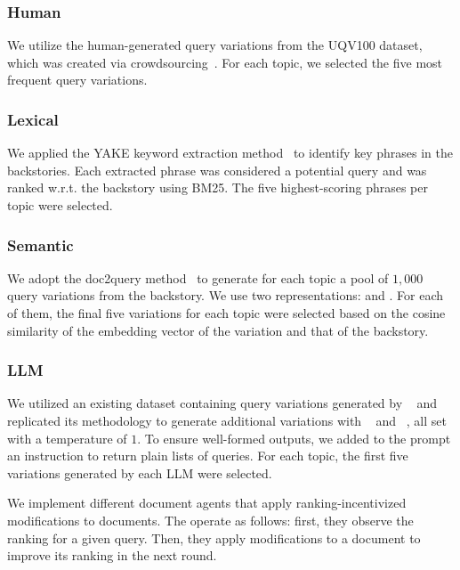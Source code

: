 \subsubsection*{Human} 
We utilize the human-generated query variations from the UQV100 dataset, which was created via crowdsourcing~\cite{uqv100}. For each topic, we selected the five most frequent query variations. 

\subsubsection*{Lexical}
We applied the YAKE keyword extraction method~\cite{YAKE} to identify key phrases in the backstories. Each extracted phrase was considered a potential query and was ranked w.r.t. the backstory using BM25. The five highest-scoring phrases per topic were selected.

\subsubsection*{Semantic} 
We adopt the doc2query method~\cite{doc2query} to generate for each topic a pool of $1,000$ query variations from the backstory.
We use two representations: \efive and \contriever.
For each of them, the final five variations for each topic were selected based on the cosine similarity of the embedding vector of the variation and that of the backstory. 


\subsubsection*{LLM}
We utilized an existing dataset containing query variations generated by \gptWithVersion~\cite{llm-query-variations} and replicated its methodology to generate additional variations with \llama~\cite{dubey_llama_2024} and \gemma~\cite{gemma_team_gemma_nodate}, all set with a temperature of $1$.
To ensure well-formed outputs, we added to the prompt an instruction to return plain lists of queries. For each topic, the first five variations generated by each LLM were selected.





We implement different document agents that apply ranking-incentivized modifications to documents. 
The \botagents operate as follows: first, they observe the ranking for a given query. Then, they apply modifications to a document to improve its ranking in the next round.

